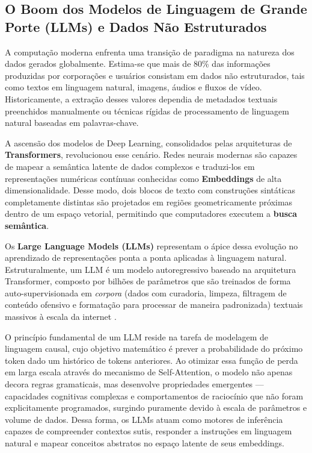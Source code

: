 \documentclass[12pt]{article}
\begin{document}
	\subsection{O Boom dos Modelos de Linguagem de Grande Porte (LLMs) e Dados Não Estruturados}
	
	A computação moderna enfrenta uma transição de paradigma na natureza dos dados gerados globalmente. Estima-se que mais de 80\% das informações produzidas por corporações e usuários consistam em dados não estruturados, tais como textos em linguagem natural, imagens, áudios e fluxos de vídeo. Historicamente, a extração desses valores dependia de metadados textuais preenchidos manualmente ou técnicas rígidas de processamento de linguagem natural baseadas em palavras-chave.

    A ascensão dos modelos de Deep Learning, consolidados pelas arquiteturas de \textbf{Transformers}, revolucionou esse cenário. Redes neurais modernas são capazes de mapear a semântica latente de dados complexos e traduzi-los em representações numéricas contínuas conhecidas como \textbf{Embeddings} de alta dimensionalidade. Desse modo, dois blocos de texto com construções sintáticas completamente distintas são projetados em regiões geometricamente próximas dentro de um espaço vetorial, permitindo que computadores executem a \textbf{busca semântica}.

    Os \textbf{Large Language Models (LLMs)} representam o ápice dessa evolução no aprendizado de representações ponta a ponta aplicadas à linguagem natural. Estruturalmente, um LLM é um modelo autoregressivo baseado na arquitetura Transformer, composto por bilhões de parâmetros que são treinados de forma auto-supervisionada em \textit{corpora} (dados com curadoria, limpeza, filtragem de conteúdo ofensivo e formatação para processar de maneira padronizada) textuais massivos à escala da internet \cite {zhao2023survey}. 
    
    O princípio fundamental de um LLM reside na tarefa de modelagem de linguagem causal, cujo objetivo matemático é prever a probabilidade do próximo token dado um histórico de tokens anteriores. Ao otimizar essa função de perda em larga escala através do mecanismo de Self-Attention, o modelo não apenas decora regras gramaticais, mas desenvolve propriedades emergentes — capacidades cognitivas complexas e comportamentos de raciocínio que não foram explicitamente programados, surgindo puramente devido à escala de parâmetros e volume de dados. Dessa forma, os LLMs atuam como motores de inferência capazes de compreender contextos sutis, responder a instruções em linguagem natural e mapear conceitos abstratos no espaço latente de seus embeddings.
\end{document}
